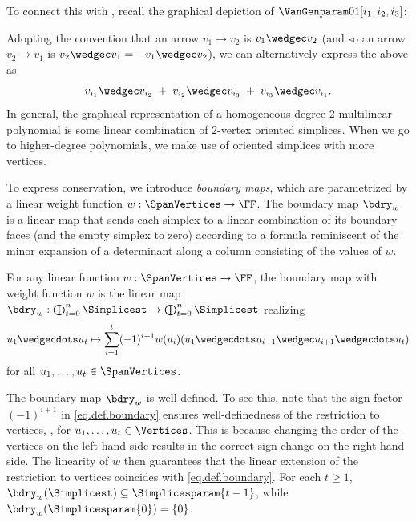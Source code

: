 \documentclass{toc}
\begin{document}
To connect this with ,
recall the graphical depiction of
\(\VanGenparam01[{i_1}, {i_2}, {i_3}]\):
\begin{center}
\end{center}
Adopting the convention that an arrow \(v_1\to v_2\) is
\(v_1\wedgec v_2\)
(and so an arrow \(v_2\to v_1\) is
\(v_2\wedgec v_1 = -v_1\wedgec v_2\)),
we can alternatively express the above as
\[
  v_{i_1}\wedgec v_{i_2} \;+\; v_{i_2}\wedgec v_{i_3} \;+\; v_{i_3}\wedgec v_{i_1}.
\]
In general, the graphical representation of a homogeneous degree-2 multilinear
polynomial is some linear combination of 2-vertex oriented simplices.
When we go to higher-degree polynomials,
we make use of oriented simplices with more vertices.

To express conservation, we introduce \emph{boundary maps}, which are parametrized by a linear weight function \(w : \SpanVertices \to \FF\). The boundary map \(\bdry_w\) is a linear map that sends each simplex to a linear combination of its boundary faces (and the empty simplex to zero) according to a formula reminiscent of the minor expansion of a determinant along a column consisting of the values of $w$.
\begin{definition}
  \label{def.polybdry}
  For any linear function \(w : \SpanVertices \to\FF\),
  the boundary map with weight function \(w\) is the linear map 
  \(\bdry_w : \bigoplus_{t=0}^{n}\Simplicest \to \bigoplus_{t=0}^{n}\Simplicest\)
  realizing
  \begin{equation}\label{eq.def.boundary}
    u_1 \wedgecdots u_t
    \mapsto
      \sum_{i=1}^t (-1)^{i+1} w(u_i) 
      (u_1 \wedgecdots u_{i-1}\wedgec u_{i+1}\wedgecdots u_t)
  \end{equation}
  for all $u_1, \dots, u_t \in \SpanVertices$.
\end{definition}
The boundary map $\bdry_w$ is well-defined. To see this, note that the sign factor $(-1)^{i+1}$ in \eqref{eq.def.boundary} ensures well-definedness of the restriction to vertices, \ie, for $u_1, \dots, u_t \in \Vertices$. This is because changing the order of the vertices on the left-hand side results in the correct sign change on the right-hand side. The linearity of $w$ then guarantees that the linear extension of the restriction to vertices coincides with \eqref{eq.def.boundary}. 
For each \(t \ge 1\),
\(\bdry_w(\Simplicest) \subseteq \Simplicesparam{t-1}\),
while \(\bdry_w(\Simplicesparam{0}) = \{0\}\).
\end{document}
